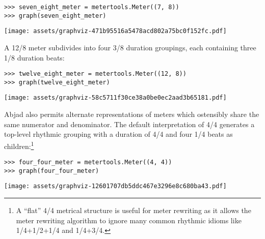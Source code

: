 \begin{abjadbookoutput}
\begin{singlespacing}
\vspace{-0.5\baselineskip}
\begin{lstlisting}
>>> seven_eight_meter = metertools.Meter((7, 8))
>>> graph(seven_eight_meter)
\end{lstlisting}
\noindent\texttt{[image: assets/graphviz-471b95516a5478acd802a75bc0f152fc.pdf]}
\end{singlespacing}
\end{abjadbookoutput}

\noindent A 12/8 meter subdivides into four 3/8 duration groupings, each
containing three 1/8 duration beats:

\begin{comment}
<abjad>
twelve_eight_meter = metertools.Meter((12, 8))
graph(twelve_eight_meter)
</abjad>
\end{comment}

\begin{abjadbookoutput}
\begin{singlespacing}
\vspace{-0.5\baselineskip}
\begin{lstlisting}
>>> twelve_eight_meter = metertools.Meter((12, 8))
>>> graph(twelve_eight_meter)
\end{lstlisting}
\noindent\texttt{[image: assets/graphviz-58c5711f30ce38a0be0ec2aad3b65181.pdf]}
\end{singlespacing}
\end{abjadbookoutput}

\noindent Abjad also permits alternate representations of meters which
ostensibly share the same numerator and denominator. The default interpretation
of 4/4 generates a top-level rhythmic grouping with a duration of 4/4 and four
1/4 beats as children:\footnote{A \enquote{flat} 4/4 metrical structure is
useful for meter rewriting as it allows the meter rewriting algorithm to ignore
many common rhythmic idioms like 1/4+1/2+1/4 and 1/4+3/4.}

\begin{comment}
<abjad>
four_four_meter = metertools.Meter((4, 4))
graph(four_four_meter)
</abjad>
\end{comment}

\begin{abjadbookoutput}
\begin{singlespacing}
\vspace{-0.5\baselineskip}
\begin{lstlisting}
>>> four_four_meter = metertools.Meter((4, 4))
>>> graph(four_four_meter)
\end{lstlisting}
\noindent\texttt{[image: assets/graphviz-12601707db5ddc467e3296e8c680ba43.pdf]}
\end{singlespacing}
\end{abjadbookoutput}

